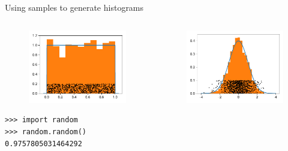 \documentclass[12pt, aspectratio=149]{beamer}
\theoremstyle{plain}
\begin{document}
\begin{frame}[fragile]{Using samples to generate histograms}
\begin{columns}
\begin{column}{0.5\textwidth}
    \begin{center}
     \begin{figure}
     	\centering
     	\includegraphics[width=0.99\linewidth]{figures/uniform_samples_hist}
     \end{figure}
     \begin{verbatim}
>>> import random
>>> random.random()
0.9757805031464292
     \end{verbatim}
     \end{center}
\end{column}
\begin{column}{0.5\textwidth}  %
    \begin{center}
     \begin{figure}
     	\centering
     	\includegraphics[width=0.99\linewidth]{figures/normal_samples_hist}

\end{figure}
\end{center}
\end{column}
\end{columns}
\end{frame}
\end{document}

